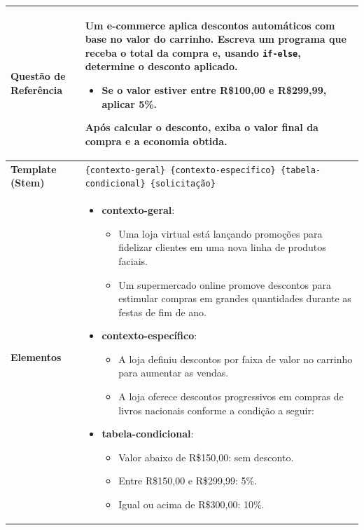 \begin{table}[htbp]
\centering
\begin{tabular}{|l|p{10cm}|}
\hline
\textbf{Questão de Referência} 
& Um e-commerce aplica descontos automáticos com base no valor do carrinho. Escreva um programa que receba o total da compra e, usando \texttt{if-else}, determine o desconto aplicado.  
\begin{itemize}
    \item Se o valor estiver entre R\$100,00 e R\$299,99, aplicar 5\%.
\end{itemize}
Após calcular o desconto, exiba o valor final da compra e a economia obtida. \\
\hline

\textbf{Template (Stem)} 
& \texttt{\{contexto-geral\} \{contexto-específico\} \{tabela-condicional\} \{solicitação\}} \\
\hline

\textbf{Elementos} 
& 
\begin{itemize}[leftmargin=1em]
  \item \textbf{contexto-geral}:
    \begin{itemize}[leftmargin=1em]
      \item Uma loja virtual está lançando promoções para fidelizar clientes em uma nova linha de produtos faciais.
      \item  Um supermercado online promove descontos para estimular compras em grandes quantidades durante as festas de fim de ano.
    \end{itemize}

  \item \textbf{contexto-específico}:
    \begin{itemize}[leftmargin=1em]
      \item A loja definiu descontos por faixa de valor no carrinho para aumentar as vendas.
      \item A loja oferece descontos progressivos em compras de livros nacionais conforme a condição a seguir:
    \end{itemize}

  \item \textbf{tabela-condicional}:
    \begin{itemize}[leftmargin=1em]
      \item Valor abaixo de R\$150,00: sem desconto.
      \item Entre R\$150,00 e R\$299,99: 5\%.
      \item Igual ou acima de R\$300,00: 10\%.
    \end{itemize}


\end{itemize}
\end{tabular}
\end{table}
